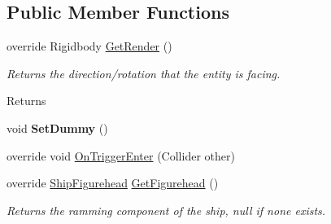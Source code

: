 \subsection*{Public Member Functions}
\begin{DoxyCompactItemize}
\item 
\hypertarget{class_skyrates_1_1_client_1_1_entity_1_1_entity_player_ship_af4320dc0c326ab78d70aae024618f6de}{override Rigidbody \hyperlink{class_skyrates_1_1_client_1_1_entity_1_1_entity_player_ship_af4320dc0c326ab78d70aae024618f6de}{Get\-Render} ()}\label{class_skyrates_1_1_client_1_1_entity_1_1_entity_player_ship_af4320dc0c326ab78d70aae024618f6de}

\begin{DoxyCompactList}\small\item\em Returns the direction/rotation that the entity is facing. 

\begin{DoxyReturn}{Returns}

\end{DoxyReturn}
 \end{DoxyCompactList}\item 
\hypertarget{class_skyrates_1_1_client_1_1_entity_1_1_entity_player_ship_a20c534da8e4fac292800c1e2f4d78f8c}{void {\bfseries Set\-Dummy} ()}\label{class_skyrates_1_1_client_1_1_entity_1_1_entity_player_ship_a20c534da8e4fac292800c1e2f4d78f8c}

\item 
\hypertarget{class_skyrates_1_1_client_1_1_entity_1_1_entity_player_ship_a6f1c770d679c0f7fdd5e48f592983386}{override void \hyperlink{class_skyrates_1_1_client_1_1_entity_1_1_entity_player_ship_a6f1c770d679c0f7fdd5e48f592983386}{On\-Trigger\-Enter} (Collider other)}\label{class_skyrates_1_1_client_1_1_entity_1_1_entity_player_ship_a6f1c770d679c0f7fdd5e48f592983386}

\item 
\hypertarget{class_skyrates_1_1_client_1_1_entity_1_1_entity_player_ship_ae82ff64089a164c1554405f636ca5d1c}{override \hyperlink{class_skyrates_1_1_client_1_1_ship_1_1_ship_figurehead}{Ship\-Figurehead} \hyperlink{class_skyrates_1_1_client_1_1_entity_1_1_entity_player_ship_ae82ff64089a164c1554405f636ca5d1c}{Get\-Figurehead} ()}\label{class_skyrates_1_1_client_1_1_entity_1_1_entity_player_ship_ae82ff64089a164c1554405f636ca5d1c}

\begin{DoxyCompactList}\small\item\em Returns the ramming component of the ship, null if none exists. 


\end{DoxyCompactList}
\end{DoxyCompactItemize}
